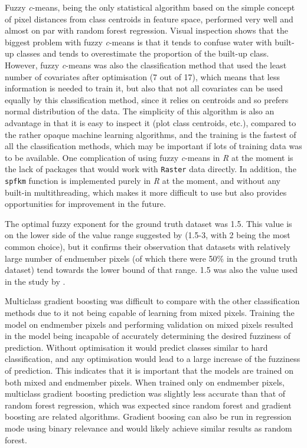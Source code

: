 \documentclass[a4paper,10pt]{book}
\begin{document}
Fuzzy \textit{c}-means, being the only statistical algorithm based on the simple concept of pixel distances from class centroids in feature space, performed very well and almost on par with random forest regression. Visual inspection shows that the biggest problem with fuzzy \textit{c}-means is that it tends to confuse water with built-up classes and tends to overestimate the proportion of the built-up class. However, fuzzy \textit{c}-means was also the classification method that used the least number of covariates after optimisation (7 out of 17), which means that less information is needed to train it, but also that not all covariates can be used equally by this classification method, since it relies on centroids and so prefers normal distribution of the data. The simplicity of this algorithm is also an advantage in that it is easy to inspect it (plot class centroids, etc.), compared to the rather opaque machine learning algorithms, and the training is the fastest of all the classification methods, which may be important if lots of training data was to be available. One complication of using fuzzy \textit{c}-means in \textit{R} at the moment is the lack of packages that would work with \texttt{Raster} data directly. In addition, the \texttt{spfkm} function is implemented purely in \textit{R} at the moment, and without any built-in multithreading, which makes it more difficult to use but also provides opportunities for improvement in the future.

The optimal fuzzy exponent for the ground truth dataset was 1.5. This value is on the lower side of the value range suggested by \citet{Okeke2006fuzzyexponent} (1.5-3, with 2 being the most common choice), but it confirms their observation that datasets with relatively large number of endmember pixels (of which there were 50\% in the ground truth dataset) tend towards the lower bound of that range. 1.5 was also the value used in the study by \citet{burrough2001fuzzy}.

Multiclass gradient boosting was difficult to compare with the other classification methods due to it not being capable of learning from mixed pixels. Training the model on endmember pixels and performing validation on mixed pixels resulted in the model being incapable of accurately determining the desired fuzziness of prediction. Without optimisation it would predict classes similar to hard classification, and any optimisation would lead to a large increase of the fuzziness of prediction. This indicates that it is important that the models are trained on both mixed and endmember pixels. When trained only on endmember pixels, multiclass gradient boosting prediction was slightly less accurate than that of random forest regression, which was expected since random forest and gradient boosting are related algorithms. Gradient boosing can also be run in regression mode using binary relevance and would likely achieve similar results as random forest.
\end{document}
